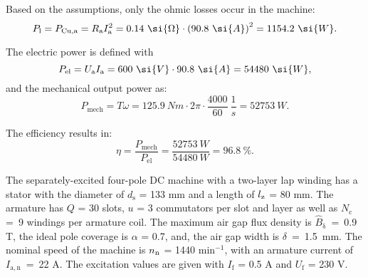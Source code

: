 

\begin{solutionblock}
    Based on the assumptions, only the ohmic losses occur in the machine:
    \begin{equation}
        \Pl = \Pcu = \Ra I_{\mathrm{a}}^2
        = 0.14 \ \si{\Omega} \cdot \left(90.8 \ \si{A} \right)^2
        = 1154.2 \ \si{W}.
    \end{equation}
   

\end{solutionblock}





\begin{solutionblock}

    The electric power is defined with
    \begin{equation}
        P_{\mathrm{el}} = \Ua \Ia
        = 600 \ \si{V} \cdot 90.8 \ \si{A}
        = 54480 \ \si{W},
    \end{equation}
    and the mechanical output power as:
    \begin{equation}
        P_{\mathrm{mech}} = T \omega 
        = 125.9 \ \si{Nm} \cdot 2 \pi \cdot \frac{4000}{60} \ \si{\frac{1}{s}}
        = 52753\ \si{W}.
    \end{equation}

    The efficiency results in:
    \begin{equation}
        \eta = \frac{P_{\mathrm{mech}}}{P_{\mathrm{el}}}
        = \frac{52753 \ \si{W}}{54480 \ \si{W}}
        = 96.8 \ \%.
    \end{equation}
\end{solutionblock}




The separately-excited four-pole DC machine with a two-layer lap winding has a stator with the diameter of $d_{\mathrm{s}}$ = 133 mm and a length of $l_{\mathrm{z}}$ = 80 mm.
The armature has $Q$ = 30 slots, $u$ = 3 commutators per slot and layer as well as $N_{\mathrm{c}}~$=~9 windings per armature coil.
The maximum air gap flux density is $\hat{B}_{\updelta}$~=~0.9 T, the ideal pole coverage is $\alpha$ = 0.7, and, the air gap width is $\delta$~=~1.5~mm.
The nominal speed of the machine is $n_{\mathrm{n}}$ = 1440 $\mathrm{min}^{-1}$, with an armature current of $I_{\mathrm{a,n}}$~=~22 A. The excitation values are given with $I_{\mathrm{f}}$ = 0.5 A and $U_{\mathrm{f}}$ = 230 V.



